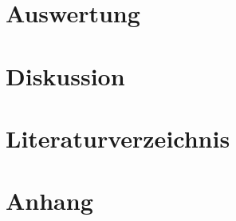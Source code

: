 \documentclass[12pt]{article}
\begin{document}
\section{Auswertung}\label{sec:auswertung}

\section{Diskussion}\label{sec:diskussion}

\section{Literaturverzeichnis}\label{sec:literaturverzeichnis}
\printbibliography[heading = none]
\newpage

\section{Anhang}\label{sec:anhang}
\end{document}
